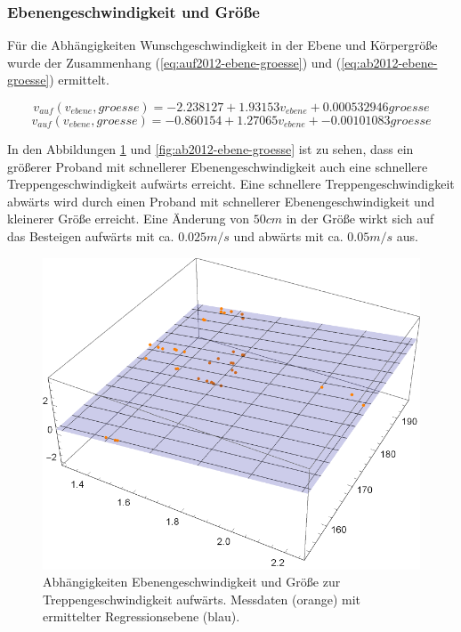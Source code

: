 \subsubsection{Ebenengeschwindigkeit und Größe}

Für die Abhängigkeiten Wunschgeschwindigkeit in der Ebene und Körpergröße wurde 
der Zusammenhang (\ref{eq:auf2012-ebene-groesse}) und (\ref{eq:ab2012-ebene-groesse}) ermittelt.

\begin{equation} \label{eq:auf2012-ebene-groesse}
	v_{auf}(v_{ebene}, groesse) = -2.23812 7 + 1.93153 v_{ebene} + 0.000532946 groesse
\end{equation}
\begin{equation} \label{eq:ab2012-ebene-groesse}
	v_{auf}(v_{ebene}, groesse) = -0.860154 + 1.27065 v_{ebene} + -0.00101083 groesse
\end{equation}

In den Abbildungen \ref{fig:auf2012-ebene-groesse} und \ref{fig:ab2012-ebene-groesse} ist 
zu sehen, dass ein größerer Proband mit schnellerer Ebenengeschwindigkeit auch eine schnellere Treppengeschwindigkeit aufwärts erreicht. Eine schnellere Treppengeschwindigkeit abwärts wird durch einen Proband mit schnellerer Ebenengeschwindigkeit und kleinerer Größe erreicht. Eine Änderung von $50 cm$ in der Größe wirkt sich auf das Besteigen aufwärts mit ca. $0.025 m/s$ und abwärts mit ca. $0.05 m/s$ aus.

\begin{figure} \centering 
	\includegraphics[]{abbildungen/regression/2012/auf-ebene-groesse.pdf}
	
	\caption{Abhängigkeiten Ebenengeschwindigkeit und Größe zur Treppengeschwindigkeit aufwärts. Messdaten (orange) mit ermittelter Regressionsebene (blau). \label{fig:auf2012-ebene-groesse}}
\end{figure}

